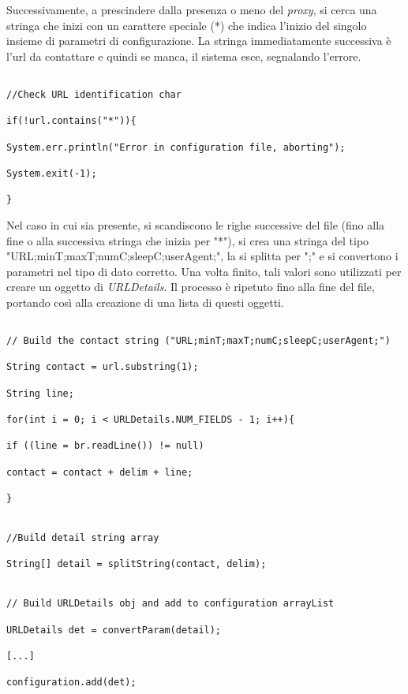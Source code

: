 Successivamente, a prescindere dalla presenza o meno del \textit{proxy}, si cerca una stringa che inizi con un carattere speciale (*) che indica l'inizio del singolo insieme di parametri di configurazione. La stringa immediatamente successiva \`{e} l'url da contattare e quindi se manca, il sistema esce, segnalando l'errore. 


\begin{lstlisting}

//Check URL identification char

if(!url.contains("*")){

System.err.println("Error in configuration file, aborting");

System.exit(-1);

}

\end{lstlisting}


Nel caso in cui sia presente, si scandiscono le righe successive del file (fino alla fine o alla successiva stringa che inizia per "*"), si crea una stringa del tipo "URL;minT;maxT;numC;sleepC;userAgent;", la si splitta per ";" e si convertono i parametri nel tipo di dato corretto. Una volta finito, tali valori sono utilizzati per creare un oggetto di \textit{URLDetails}. Il processo \`{e} ripetuto fino alla fine del file, portando cos\`{i} alla creazione di una lista di questi oggetti. 

\begin{lstlisting}

// Build the contact string ("URL;minT;maxT;numC;sleepC;userAgent;")

String contact = url.substring(1);

String line;

for(int i = 0; i < URLDetails.NUM_FIELDS - 1; i++){

if ((line = br.readLine()) != null)

contact = contact + delim + line;

}


//Build detail string array

String[] detail = splitString(contact, delim);


// Build URLDetails obj and add to configuration arrayList

URLDetails det = convertParam(detail);

[...]

configuration.add(det);

\end{lstlisting}



